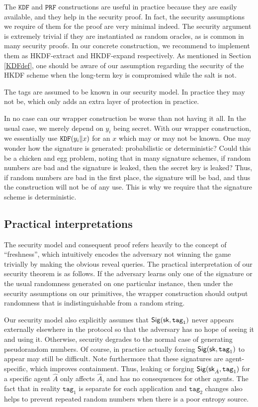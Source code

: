 \documentclass[12pt]{article}
\begin{document}
The $\texttt{KDF}$ and $\texttt{PRF}$ constructions are useful in practice because they are easily available, and they help in the security proof. In fact, the security assumptions we require of them for the proof are very minimal indeed. The security argument is extremely trivial if they are instantiated as random oracles, as is common in many security proofs. In our concrete construction, we recommend to implement them as HKDF-extract and HKDF-expand respectively. As mentioned in Section \ref{KDFdef}, one should be aware of our assumption regarding the security of the HKDF scheme when the long-term key is compromised while the salt is not.

The tags are assumed to be known in our security model. In practice they may not be, which only adds an extra layer of protection in practice.

In no case can our wrapper construction be worse than not having it all. In the usual case, we merely depend on $y_i$ being secret. With our wrapper construction, we essentially use $\texttt{KDF}(y_i \| x)$ for an $x$ which may or may not be known. One may wonder how the signature is generated: probabilistic or deterministic? Could this be a chicken and egg problem, noting that in many signature schemes, if random numbers are bad and the signature is leaked, then the secret key is leaked? Thus, if random numbers are bad in the first place, the signature will be bad, and thus the construction will not be of any use. This is why we require that the signature scheme is deterministic.

\subsection{Practical interpretations}
The security model and consequent proof refers heavily to the concept of ``freshness'', which intuitively encodes the adversary not winning the game trivially by making the obvious reveal queries. The practical interpretation of our security theorem is as follows. If the adversary learns only one of the signature or the usual randomness generated on one particular instance, then under the security assumptions on our primitives, the wrapper construction should output randomness that is indistinguishable from a random string.

Our security model also explicitly assumes that $\mathsf{Sig} (\mathsf{sk}, \texttt{tag}_1)$ never appears externally elsewhere in
the protocol so that the adversary has no hope of seeing it and using it. Otherwise, security degrades to the normal case of generating pseudorandom numbers. Of course, in practice actually
forcing $\mathsf{Sig} (\mathsf{sk}, \texttt{tag}_1)$ to appear may still be difficult.  Note furthermore that these
signatures are agent-specific, which improves containment. Thus, leaking
or forging $\mathsf{Sig} (\mathsf{sk}_{\hat A}, \texttt{tag}_1)$ for a specific agent $\hat A$ only affects $\hat A$, and
has no consequences for other agents.  The fact that in reality $\texttt{tag}_1$ is separate for each application and $\texttt{tag}_2$ changes also helps to prevent repeated random numbers when there is a poor entropy source. 



\end{document}
